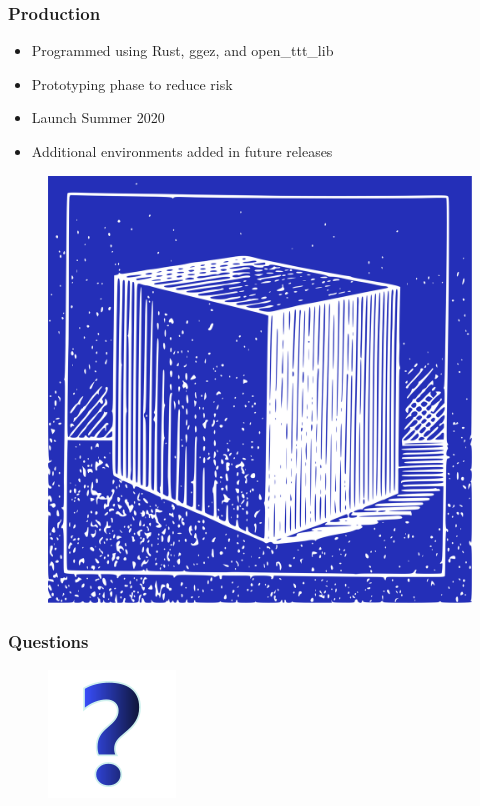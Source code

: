 \documentclass{beamer}
\begin{document}
\begin{frame}
  \frametitle{Production}

  \begin{itemize}
    \item Programmed using Rust, ggez, and open\_ttt\_lib
    \item Prototyping phase to reduce risk
    \item Launch Summer 2020
    \item Additional environments added in future releases
  \end{itemize}

  \begin{figure}
    \vspace{1em}
    \includegraphics[height=0.40\textheight]{img/clip-art/blueprint-cube}
  \end{figure}

\end{frame}


\begin{frame}
  \frametitle{Questions}

  \begin{figure}
    \includegraphics[height=0.50\textheight]{img/clip-art/question-mark}
  \end{figure}

\end{frame}
\end{document}
